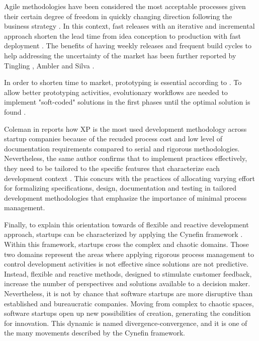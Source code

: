 \documentclass[final,5p,times,twocolumn]{elsarticle}
\begin{document}
Agile methodologies have been considered the most acceptable processes given their certain degree of freedom in quickly changing direction following the business strategy \cite{Taipale2010}. In this context, fast releases with an iterative and incremental approach shorten the lead time from idea conception to production with fast deployment \cite{Taipale2010}. The benefits  of having  weekly releases and frequent build cycles to help addressing the uncertainty of the market has been further reported by Tingling \cite{Tingling2007}, Ambler \cite{Ambler2002} and Silva \cite{Silva2005}.

In order to shorten time to market, prototyping is essential according to \cite{Deakins2005, Camel1994a}. To allow better prototyping activities, evolutionary workflows are needed to implement "soft-coded" solutions in the first phases until the optimal solution is found \cite{Deakins2005, Sutton2000}. 

Coleman in \cite{Coleman2007} reports how XP is the most used development methodology across startup companies because of the recuded process cost and low level of documentation requirements compared to serial and rigorous methodologies. Nevertheless, the same author confirms that to implement practices effectively, they need to be tailored to the specific features that characterize each development context \cite{Coleman2007, Coleman2008}. This concurs with the practices of allocating varying effort for formalizing specifications, design, documentation and testing in tailored development methodologies \cite{Ambler2002, Zettel2001, Camel1994a} that emphasize the importance of minimal process management.

Finally, to explain this orientation towards of flexible and reactive development approach, startups can be characterized by applying the Cynefin framework \cite{Kurtz2003}. Within this framework, startups cross the complex and chaotic domains. Those two domains represent the areas where applying rigorous process management to control development activities is not effective since solutions are not predictive. Instead, flexible and reactive methods, designed to stimulate customer feedback, increase the number of perspectives and solutions available to a decision maker. Nevertheless, it is not by chance that software startups are more disruptive than established and bureaucratic companies. Moving from complex to chaotic spaces, software startups open up new possibilities of creation, generating the condition for innovation. This dynamic is named divergence-convergence, and it is one of the many movements described by the Cynefin framework. 
\end{document}
